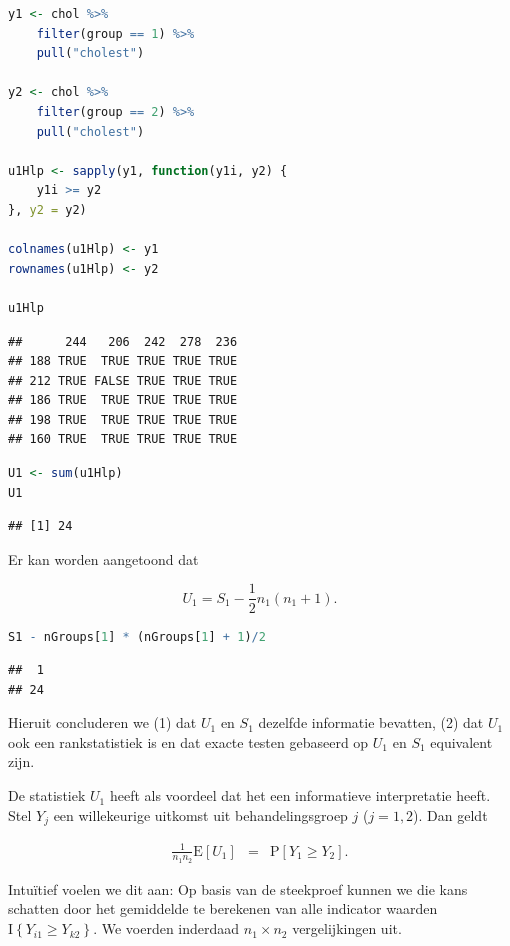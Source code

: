 \documentclass[
  12pt,dutch,coursenotes]{book}
\theoremstyle{definition}
\theoremstyle{definition}
\theoremstyle{definition}
\theoremstyle{definition}
\theoremstyle{remark}
\begin{document}
\begin{lstlisting}[language=R]
y1 <- chol %>%
    filter(group == 1) %>%
    pull("cholest")

y2 <- chol %>%
    filter(group == 2) %>%
    pull("cholest")

u1Hlp <- sapply(y1, function(y1i, y2) {
    y1i >= y2
}, y2 = y2)

colnames(u1Hlp) <- y1
rownames(u1Hlp) <- y2

u1Hlp
\end{lstlisting}

\begin{lstlisting}
##      244   206  242  278  236
## 188 TRUE  TRUE TRUE TRUE TRUE
## 212 TRUE FALSE TRUE TRUE TRUE
## 186 TRUE  TRUE TRUE TRUE TRUE
## 198 TRUE  TRUE TRUE TRUE TRUE
## 160 TRUE  TRUE TRUE TRUE TRUE
\end{lstlisting}

\begin{lstlisting}[language=R]
U1 <- sum(u1Hlp)
U1
\end{lstlisting}

\begin{lstlisting}
## [1] 24
\end{lstlisting}

Er kan worden aangetoond dat

\[U_1 = S_1 - \frac{1}{2}n_1(n_1+1).\]

\begin{lstlisting}[language=R]
S1 - nGroups[1] * (nGroups[1] + 1)/2
\end{lstlisting}

\begin{lstlisting}
##  1 
## 24
\end{lstlisting}

Hieruit concluderen we (1) dat \(U_1\) en \(S_1\) dezelfde informatie bevatten, (2) dat \(U_1\) ook een rankstatistiek is en dat exacte testen gebaseerd op \(U_1\) en \(S_1\) equivalent zijn.

De statistiek \(U_1\) heeft als voordeel dat het een informatieve interpretatie heeft.
Stel \(Y_j\) een willekeurige uitkomst uit behandelingsgroep \(j\) (\(j=1,2\)). Dan geldt

\begin{eqnarray*}
  \frac{1}{n_1n_2}\text{E}\left[U_1\right]
     &=& \text{P}\left[Y_1 \geq Y_2\right].
\end{eqnarray*}

Intuïtief voelen we dit aan: Op basis van de steekproef kunnen we die kans schatten door het gemiddelde te berekenen van alle indicator waarden \(\text{I}\left\{Y_{i1}\geq Y_{k2}\right\}\).
We voerden inderdaad \(n_1 \times n_2\) vergelijkingen uit.
\end{document}
